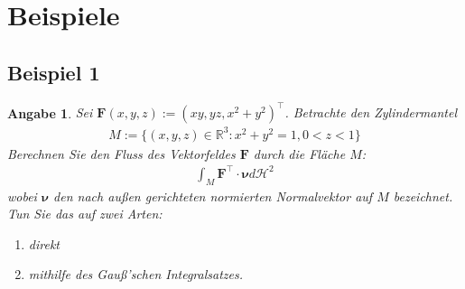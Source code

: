 \documentclass[]{article}
\newtheorem*{angabe*}{Angabe}
\begin{document}
\section{Beispiele}

\subsection*{Beispiel 1}
\begin{angabe*}
	Sei $\bm{F}(x,y,z) := (xy, yz, x^2+y^2)^\top$. Betrachte den Zylindermantel
	\begin{align*}
		M := \{(x,y,z) \in \mathbb{R}^3: x^2+y^2=1, 0<z<1\}
	\end{align*}
	Berechnen Sie den Fluss des Vektorfeldes $\mathbf{F}$ durch die Fläche $M$:
	\begin{align*}
		\int_M \bm{F}^\top \cdot \bm{\nu} d\mathcal{H}^2
	\end{align*}
	wobei $\bm{\nu}$ den nach außen gerichteten normierten Normalvektor auf $M$ bezeichnet.
	Tun Sie das auf zwei Arten:
	\begin{enumerate}[label=(\roman*)]
		\item direkt
		\item mithilfe des Gauß'schen Integralsatzes.
	\end{enumerate}
\end{angabe*}
\end{document}
